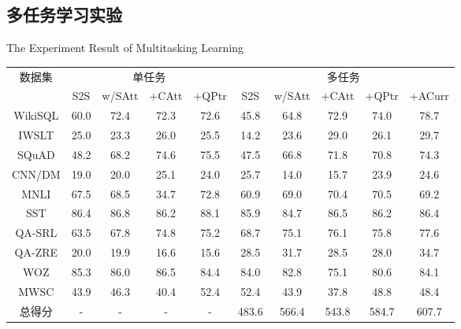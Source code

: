\subsection{多任务学习实验}

\begin{table}[!htpb]
    {The Experiment Result of Multitasking Learning}
  \label{tab:drwwldsyjg}
  \centering
  \begin{threeparttable}[b]
     \begin{tabular}{cccccccccc}
      \toprule
      \multirow{2}{18mm}{数据集}&\multicolumn{4}{c}{单任务} & \multicolumn{5}{c}{多任务}\\
      \cmidrule(lr){2-5}\cmidrule(lr){6-10}
      & S2S & w/SAtt & +CAtt & +QPtr & S2S & w/SAtt & +CAtt & +QPtr & +ACurr\\
      \midrule
      WikiSQL & 60.0 & 72.4 & 72.3 & 72.6 & 45.8 & 64.8 & 72.9 & 74.0 & 78.7\\
      IWSLT & 25.0 & 23.3 & 26.0 & 25.5 & 14.2 & 23.6 & 29.0 & 26.1 & 29.7\\
      SQuAD & 48.2 & 68.2 & 74.6 & 75.5 & 47.5 & 66.8 & 71.8 & 70.8 & 74.3\\
      CNN/DM & 19.0 & 20.0 & 25.1 & 24.0 & 25.7 & 14.0 & 15.7 & 23.9 & 24.6\\
      MNLI & 67.5 & 68.5 & 34.7 & 72.8 & 60.9 & 69.0 & 70.4 & 70.5 & 69.2\\
      SST & 86.4 & 86.8 & 86.2 & 88.1 & 85.9 & 84.7 & 86.5 & 86.2 & 86.4\\
      QA-SRL & 63.5 & 67.8 & 74.8 & 75.2 & 68.7 & 75.1 & 76.1 & 75.8 & 77.6\\
      QA-ZRE & 20.0 & 19.9 & 16.6 & 15.6 & 28.5 & 31.7 & 28.5 & 28.0 & 34.7\\
      WOZ & 85.3 & 86.0 & 86.5 & 84.4 & 84.0 & 82.8 & 75.1 & 80.6 & 84.1\\
      MWSC & 43.9 & 46.3 & 40.4 & 52.4 & 52.4 & 43.9 & 37.8 & 48.8 & 48.4\\
      \midrule
      总得分 & - & - & - & - & 483.6 & 566.4 & 543.8 & 584.7 & 607.7\\
      \bottomrule
    \end{tabular}
  \end{threeparttable}
\end{table}

